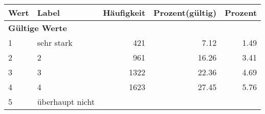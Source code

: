      \begin{longtable}{lXrrr}
     \toprule
     \textbf{Wert} & \textbf{Label} & \textbf{Häufigkeit} & \textbf{Prozent(gültig)} & \textbf{Prozent} \\
     \endhead
     \midrule
     \multicolumn{5}{l}{\textbf{Gültige Werte}}\\

     1 &
     \multicolumn{1}{X}{ sehr stark   } &


       \num{421} &
       \num[round-mode=places,round-precision=2]{7.12} &
         \num[round-mode=places,round-precision=2]{1.49} \\

     2 &
     \multicolumn{1}{X}{ 2   } &


       \num{961} &
       \num[round-mode=places,round-precision=2]{16.26} &
         \num[round-mode=places,round-precision=2]{3.41} \\

     3 &
     \multicolumn{1}{X}{ 3   } &


       \num{1322} &
       \num[round-mode=places,round-precision=2]{22.36} &
         \num[round-mode=places,round-precision=2]{4.69} \\

     4 &
     \multicolumn{1}{X}{ 4   } &


       \num{1623} &
       \num[round-mode=places,round-precision=2]{27.45} &
         \num[round-mode=places,round-precision=2]{5.76} \\

     5 &
     \multicolumn{1}{X}{ überhaupt nicht   } &



\end{longtable}
